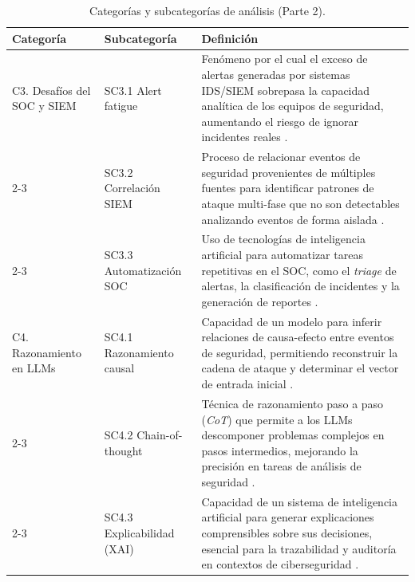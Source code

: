 \begin{table}[H]
\centering
\renewcommand{\arraystretch}{1.4}
\caption{Categorías y subcategorías de análisis (Parte 2).}
\renewcommand{\tablename}{Table}
\setlength{\arrayrulewidth}{1pt}
\begin{tabularx}{0.9\textwidth}{@{} p{2.8cm} p{3.2cm} X @{}}
\toprule
\hline
\textbf{Categoría} & \textbf{Subcategoría} & \textbf{Definición} \\
\hline
\midrule
 
C3. Desafíos del SOC y SIEM
& SC3.1 Alert fatigue
& Fenómeno por el cual el exceso de alertas generadas por sistemas
  IDS/SIEM sobrepasa la capacidad analítica de los equipos de
  seguridad, aumentando el riesgo de ignorar incidentes reales
  \cite{palma2025llm}. \\
\cline{2-3}
& SC3.2 Correlación SIEM
& Proceso de relacionar eventos de seguridad provenientes de múltiples
  fuentes para identificar patrones de ataque multi-fase que no son
  detectables analizando eventos de forma aislada
  \cite{oduola2025wazuh}. \\
\cline{2-3}
& SC3.3 Automatización SOC
& Uso de tecnologías de inteligencia artificial para automatizar tareas
  repetitivas en el SOC, como el \textit{triage} de alertas, la
  clasificación de incidentes y la generación de reportes
  \cite{hassan2026elisar}. \\
\hline
 
C4. Razonamiento en LLMs
& SC4.1 Razonamiento causal
& Capacidad de un modelo para inferir relaciones de causa-efecto entre
  eventos de seguridad, permitiendo reconstruir la cadena de ataque y
  determinar el vector de entrada inicial
  \cite{liu2026ctithinker}. \\
\cline{2-3}
& SC4.2 Chain-of-thought
& Técnica de razonamiento paso a paso (\textit{CoT}) que permite a los
  LLMs descomponer problemas complejos en pasos intermedios, mejorando
  la precisión en tareas de análisis de seguridad
  \cite{hassan2026elisar}. \\
\cline{2-3}
& SC4.3 Explicabilidad (XAI)
& Capacidad de un sistema de inteligencia artificial para generar
  explicaciones comprensibles sobre sus decisiones, esencial para la
  trazabilidad y auditoría en contextos de ciberseguridad
  \cite{wang2026sentisec}. \\
 
\bottomrule
\hline
\end{tabularx}
\label{tab:categorias_p2}
\end{table}

